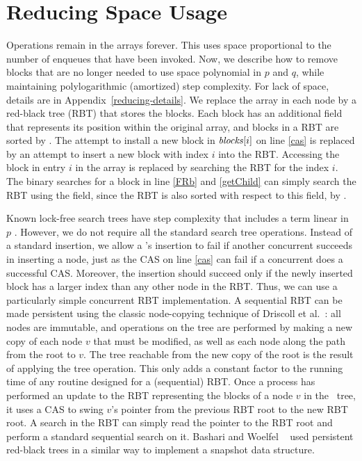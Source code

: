 
\section{Reducing Space Usage}
\label{reducing}

Operations remain in the  arrays forever. 
This uses space proportional to the number of enqueues that have been invoked.
Now, we describe how to remove blocks that are no longer needed to use space
polynomial in $p$ and $q$, while maintaining polylogarithmic (amortized) step complexity.  For lack of space, details are in Appendix~\ref{reducing-details}.
We replace the  array in each node by a red-black tree (RBT)
that stores the blocks.
Each block has an additional  field
that represents its position within the original  array, and
blocks in a RBT are sorted by .
The attempt to install a new block in $\mbox{\textit{blocks}}[i]$  on line \ref{cas}
is replaced by an attempt to insert a new block with index $i$ into the RBT.
Accessing the block in entry $i$ in the  array is 
replaced by searching the RBT for the  index $i$.
The binary searches for a block in line \ref{FRb} and \ref{getChild} can simply search the RBT
using the  field, since the RBT is also sorted with respect to this field, by .
 
Known lock-free search trees have step complexity that includes a term linear in $p$ \cite{EFHR14,Ko20}.  
However, we do not require all the standard search tree operations.
Instead of a standard insertion, we allow a 's insertion to fail if another
concurrent  succeeds in inserting a node, just as the CAS on line \ref{cas}
can fail if a concurrent  does a successful CAS.
Moreover, the insertion should succeed only if the newly inserted block has a larger index than any other node in the RBT.
Thus, we can use a particularly simple concurrent RBT implementation.
A sequential RBT can be made persistent using the classic node-copying technique of 
Driscoll et al.~\cite{DSST89}:  all nodes are immutable, and operations on the 
tree are performed by making a new copy of each node $v$ that must be modified, as well
as each node along the path from the root to $v$.
The tree reachable from the new copy of the root is the result of applying the tree operation.
This only adds a constant factor to the running time of any routine designed for a (sequential) RBT.
Once a process has performed an update to the RBT representing the blocks of a node 
$v$ in the \ordering\ tree, 
it uses a CAS to swing $v$'s pointer from the previous RBT root to the new RBT root.
A search in the RBT can simply read the pointer to the RBT root and perform a standard
sequential search on it.
Bashari and Woelfel ~\cite{DBLP:conf/podc/BashariW21} used persistent red-black trees in a similar way to implement a snapshot data structure.

